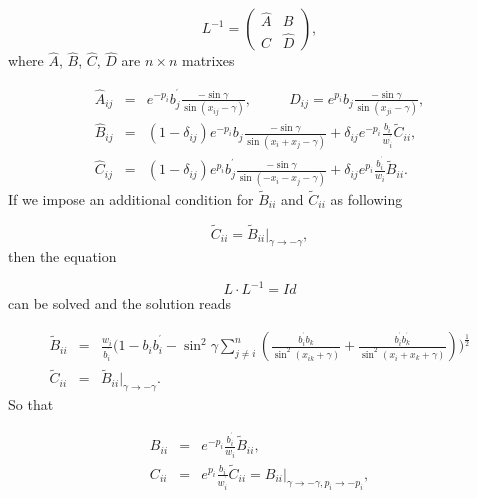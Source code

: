 \documentclass[a4paper,12pt]{article}
\begin{document}
\begin{equation}
L^{-1}=\left(
\begin{array}{ll}
\widehat{A} & \widehat{B} \\
\widehat{C} & \widehat{D}
\end{array}
\right) ,
\end{equation}
where $\widehat{A}$, $\widehat{B}$, $\widehat{C}$, $\widehat{D}$ are $%
n\times n$ matrixes

\begin{eqnarray}
\widehat{A}_{ij} &=&e^{-p_{i}}b_{j}^{^{\prime }}\frac{-\sin \gamma }{\sin
(x_{ij}-\gamma )},\ \ \ \ \ \ \ \ \ \ \ \ \widehat{D}_{ij}=e^{p_{i}}b_{j}
\frac{-\sin \gamma }{\sin (x_{ji}-\gamma )},  \nonumber \\
\widehat{B}_{ij} &=&(1-\delta _{ij})e^{-p_{i}}b_{j}\frac{-\sin \gamma }{\sin
(x_{i}+x_{j}-\gamma )}+\delta _{ij}e^{-p_{i}}\frac{b_{i}}{w_{i}^{^{\prime }}}
\widetilde{C}_{ii},  \nonumber \\
\widehat{C}_{ij} &=&(1-\delta _{ij})e^{p_{i}}b_{j}^{^{\prime }}\frac{-\sin
\gamma }{\sin (-x_{i}-x_{j}-\gamma )}+\delta _{ij}e^{p_{i}}\frac{
b_{i}^{^{\prime }}}{w_{i}}\widetilde{B}_{ii}.
\end{eqnarray}
If we impose an additional condition for $\widetilde{B}_{ii}$ and $%
\widetilde{C}_{ii}$ as following

\vspace{1pt}
\begin{equation}
\widetilde{C}_{ii}=\widetilde{B}_{ii}|_{\gamma \rightarrow -\gamma },
\label{reflection}
\end{equation}
then the equation

\begin{equation}
L\cdot L^{-1}=Id  \label{id}
\end{equation}
can be solved and the solution reads

\begin{eqnarray}
\widetilde{B}_{ii} &=&\frac{w_{i}}{b_{i}^{^{\prime }}}\Big( %
1-b_{i}b_{i}^{^{\prime }}-\sin ^{2}\gamma \sum_{j\neq i}^{n}(\frac{
b_{i}^{^{\prime }}b_{k}}{\sin ^{2}(x_{ik}+\gamma )}+\frac{b_{i}^{^{\prime
}}b_{k}^{^{\prime }}}{\sin ^{2}(x_{i}+x_{k}+\gamma )})\Big)^{\frac{1}{2}}
\nonumber \\
\widetilde{C}_{ii} &=&\widetilde{B}_{ii}|_{\gamma \rightarrow -\gamma }.
\label{lmat1}
\end{eqnarray}
So that

\begin{eqnarray}
B_{ii} &=&e^{-p_{i}}\frac{b_{i}^{^{\prime }}}{w_{i}}\widetilde{B}_{ii},
\nonumber \\
C_{ii} &=&e^{p_{i}}\frac{b_{i}}{w_{i}^{^{\prime }}}\widetilde{C}
_{ii}=B_{ii}|_{\gamma \rightarrow -\gamma ,p_{i}\rightarrow -p_{i}},
\label{lmat2}
\end{eqnarray}
\end{document}
